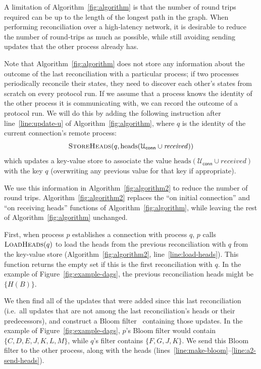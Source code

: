 \documentclass[a4paper,anonymous,USenglish]{lipics-v2019}
\begin{document}
A limitation of Algorithm~\ref{fig:algorithm} is that the number of round trips required can be up to the length of the longest path in the graph.
When performing reconciliation over a high-latency network, it is desirable to reduce the number of round-trips as much as possible, while still avoiding sending updates that the other process already has.

Note that Algorithm~\ref{fig:algorithm} does not store any information about the outcome of the last reconciliation with a particular process; if two processes periodically reconcile their states, they need to discover each other's states from scratch on every protocol run.
If we assume that a process knows the identity of the other process it is communicating with, we can record the outcome of a protocol run.
We will do this by adding the following instruction after line~\ref{line:update-u} of Algorithm~\ref{fig:algorithm}, where $q$ is the identity of the current connection's remote process:
\[ \textsc{StoreHeads}(q, \mathrm{heads}(\mathcal{U}_\mathsf{conn} \cup \mathit{received})) \]
which updates a key-value store to associate the value $\mathrm{heads}(\mathcal{U}_\mathsf{conn} \cup \mathit{received})$ with the key $q$ (overwriting any previous value for that key if appropriate).

We use this information in Algorithm~\ref{fig:algorithm2} to reduce the number of round trips.
Algorithm~\ref{fig:algorithm2} replaces the ``on initial connection'' and ``on receiving heads'' functions of Algorithm~\ref{fig:algorithm}, while leaving the rest of Algorithm~\ref{fig:algorithm} unchanged.

First, when process $p$ establishes a connection with process $q$, $p$ calls $\textsc{LoadHeads}(q)$ to load the heads from the previous reconciliation with $q$ from the key-value store (Algorithm~\ref{fig:algorithm2}, line~\ref{line:load-heads}).
This function returns the empty set if this is the first reconciliation with $q$.
In the example of Figure~\ref{fig:example-dags}, the previous reconciliation heads might be $\{H(B)\}$.

We then find all of the updates that were added since this last reconciliation (i.e.\ all updates that are not among the last reconciliation's heads or their predecessors), and construct a Bloom filter~\cite{Bloom:1970} containing those updates.
In the example of Figure~\ref{fig:example-dags}, $p$'s Bloom filter would contain $\{C, D, E, J, K, L, M\}$, while $q$'s filter contains $\{F, G, J, K\}$.
We send this Bloom filter to the other process, along with the heads (lines~\ref{line:make-bloom}--\ref{line:a2-send-heads}).
\end{document}
